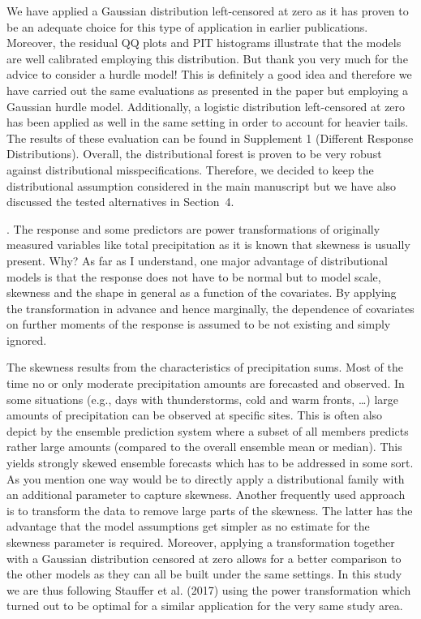 \documentclass[american,foldmarks=false,noconfig]{uibklttr}
\newenvironment{review}{\fontshape{\itdefault}\fontseries{\bfdefault} \selectfont \smallskip}{\par}
\begin{document}
We have applied a Gaussian distribution left-censored at zero
as it has proven to be an adequate choice for this type of 
application in earlier publications.
Moreover, the residual QQ plots and PIT histograms illustrate
that the models are well calibrated employing this distribution.
But thank you very much for the advice to consider a hurdle model!
This is definitely a good idea and therefore we have carried out the
same evaluations as presented in the paper but employing a
Gaussian hurdle model. Additionally, a logistic distribution 
left-censored at zero has been applied as well in the same setting in
order to account for heavier tails. The results of these evaluation
can be found in Supplement 1 (Different Response Distributions). 
Overall, the distributional forest is proven to be very robust against 
distributional misspecifications. Therefore, we decided to keep the 
distributional assumption considered in the main manuscript but we have 
also discussed the tested alternatives in Section~4.


\begin{review}
2. The response and some predictors are power transformations 
of originally measured variables like total precipitation as 
it is known that skewness is usually present. Why? As far as I 
understand, one major advantage of distributional models is
that the response does not have to be normal but to model scale, 
skewness and the shape in general as a function of the covariates. 
By applying the transformation in advance and hence marginally, 
the dependence of covariates on further moments of the response 
is assumed to be not existing and simply ignored.
\end{review}

The skewness results from the characteristics of precipitation sums. 
Most of the time no or only moderate precipitation amounts are forecasted 
and observed. In some situations (e.g., days with thunderstorms, cold and 
warm fronts, \dots) large amounts of precipitation can be observed at 
specific sites. This is often also depict by the ensemble prediction 
system where a subset of all members predicts rather large amounts 
(compared to the overall ensemble mean or median). This yields strongly 
skewed ensemble forecasts which has to be addressed in some sort.\\
As you mention one way would be to directly apply a
distributional family with an additional parameter to capture
skewness. Another frequently used approach is to transform the 
data to remove large parts of the skewness. The latter has the 
advantage that the model assumptions get simpler as no estimate 
for the skewness parameter is required. 
Moreover, applying a transformation together with a Gaussian distribution
censored at zero allows for a better comparison to the other models as 
they can all be built under the same settings.
In this study we are thus following Stauffer et al. (2017) 
using the power transformation which turned out to be optimal 
for a similar application for the very same study area.
\end{document}
